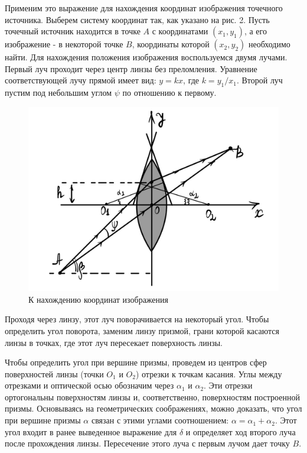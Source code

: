\documentclass[a4paper,12pt]{article} %
\begin{document}
Применим это выражение для нахождения координат изображения точечного источника. Выберем систему координат так, как указано на рис. 2. Пусть точечный источник находится в точке $A$ с координатами $\left(x_{1}, y_{1}\right)$, а его изображение - в некоторой точке $B$, координаты которой $\left(x_{2}, y_{2}\right)$ необходимо найти. Для нахождения положения изображения воспользуемся двумя лучами. Первый луч проходит через центр линзы без преломления. Уравнение соответствующей лучу прямой имеет вид: $y=k x$, где $k=y_{1} / x_{1}$. Второй луч пустим под небольшим углом $\psi$ по отношению к первому.

\begin{figure}[h!]
	\centering
	\includegraphics[scale=0.32]{IMG_1467.JPG}
	\caption{К нахождению координат изображения}
\end{figure}

Проходя через линзу, этот луч поворачивается на некоторый угол. Чтобы определить угол поворота, заменим линзу призмой, грани которой касаются линзы в точках, где этот луч пересекает поверхность линзы.

Чтобы определить угол при вершине призмы, проведем из центров сфер поверхностей линзы (точки $O_{1}$ и $O_{2}$) отрезки к точкам касания. Углы между отрезками и оптической осью обозначим через $\alpha_{1}$ и $\alpha_{2}$. Эти отрезки ортогональны поверхностям линзы и, соответственно, поверхностям построенной призмы. Основываясь на геометрических соображениях, можно доказать, что угол при вершине призмы $\alpha$ связан с этими углами соотношением: $\alpha=\alpha_{1}+\alpha_{2}$. Этот угол входит в ранее выведенное выражение для $\delta$ и определяет ход второго луча после прохождения линзы. Пересечение этого луча с первым лучом дает точку $B$.
\end{document}
